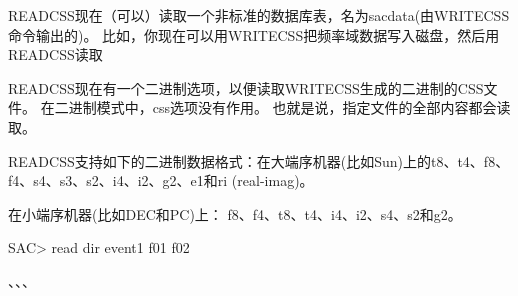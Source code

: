 READCSS现在（可以）读取一个非标准的数据库表，名为sacdata(由WRITECSS命令输出的)。%
比如，你现在可以用WRITECSS把频率域数据写入磁盘，然后用READCSS读取

READCSS现在有一个二进制选项，以便读取WRITECSS生成的二进制的CSS文件。
在二进制模式中，css选项没有作用。
也就是说，指定文件的全部内容都会读取。

READCSS支持如下的二进制数据格式：在大端序机器(比如Sun)上的t8、t4、f8、f4、s4、s3、s2、i4、i2、g2、e1和ri (real-imag)。

在小端序机器(比如DEC和PC)上： f8、f4、t8、t4、i4、i2、s4、s2和g2。

\begin{SACCode}
SAC> read dir event1 f01 f02
\end{SACCode}
、、、%
